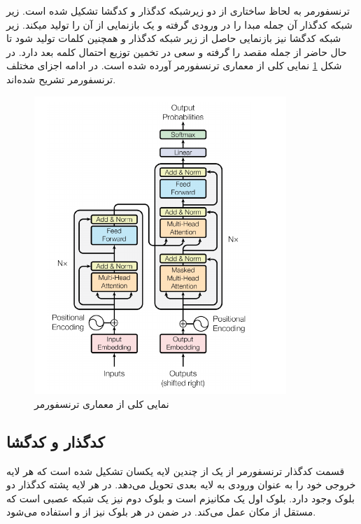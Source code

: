 ترنسفورمر به لحاظ ساختاری از دو زیرشبکه کدگذار و کدگشا تشکیل شده است.   
زیر شبکه کدگذار آن جمله مبدا را در ورودی گرفته و یک بازنمایی از آن را تولید میکند. زیر شبکه کدگشا نیز بازنمایی حاصل از زیر شبکه کدگذار و همچنین کلمات تولید شود تا حال حاضر از جمله مقصد را گرفته و سعی در تخمین توزیع احتمال کلمه بعد دارد. در شکل 
\ref{fig:chap3:transfoermer_overview}
نمایی کلی از معماری ترنسفورمر آورده شده است. در ادامه اجزای مختلف ترنسفورمر تشریح شده‌اند.


\begin{figure}[h]
	\centering
	\includegraphics[width=0.85\textwidth]{images/chap3/transformer_arch.png}
	\caption[نمایی کلی از معماری ترنسفورمر]
	{
		نمایی کلی از معماری ترنسفورمر
		\cite{transformer}
	}
	\label{fig:chap3:transfoermer_overview}
\end{figure}

\subsection{کدگذار و کدگشا}
قسمت کدگذار ترنسفورمر از یک 
از چندین لایه یکسان تشکیل شده است که هر لایه خروجی خود را به عنوان ورودی به لایه بعدی تحویل می‌دهد. در هر لایه پشته کدگذار دو بلوک وجود دارد. بلوک اول یک مکانیزم 
است و بلوک دوم نیز یک شبکه عصبی 
است که مستقل از مکان عمل می‌کند. در ضمن در هر بلوک نیز از 
و 
استفاده می‌شود.

